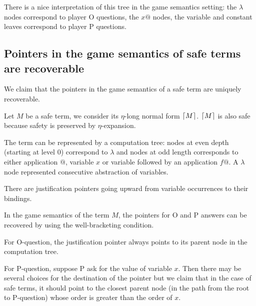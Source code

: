 There is a nice interpretation of this tree in the game semantics setting: the $\lambda$ nodes
correspond to player O questions, the $x @$ nodes, the variable and constant leaves
correspond to player P questions.


\subsection{Pointers in the game semantics of safe terms are recoverable}

We claim that the pointers in the game semantics of a safe term are
uniquely recoverable.

Let $M$ be a safe term, we consider its $\eta$-long normal form $\lceil M\rceil$.
$\lceil M\rceil$ is also safe because safety is preserved by $\eta$-expansion.


The term can be represented by a computation tree: nodes at even
depth (starting at level 0) correspond to $\lambda$ and nodes at odd
length corresponds to either application $@$, variable $x$ or
variable followed by an application $f@$. A $\lambda$ node
represented consecutive abstraction of variables.

There are justification pointers going upward from variable
occurrences to their bindings.

In the game semantics of the term $M$, the pointers for O and P
answers can be recovered by using the well-bracketing condition.

For O-question, the justification pointer always points to its
parent node in the computation tree.

For P-question, suppose P ask for the value of variable $x$. Then
there may be several choices for the destination of the pointer but
we claim that in the case of safe terms, it should point to the
closest parent node (in the path from the root to P-question) whose
order is greater than the order of $x$.
